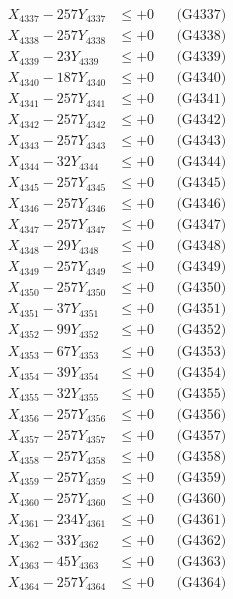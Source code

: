 \documentclass[a4paper,10pt]{article}
\begin{document}
{\begin{align}
X_{4337} - 257Y_{4337} &\leq +0 && \text{(G4337)} \\
X_{4338} - 257Y_{4338} &\leq +0 && \text{(G4338)} \\
X_{4339} - 23Y_{4339} &\leq +0 && \text{(G4339)} \\
X_{4340} - 187Y_{4340} &\leq +0 && \text{(G4340)} \\
\allowbreak
X_{4341} - 257Y_{4341} &\leq +0 && \text{(G4341)} \\
X_{4342} - 257Y_{4342} &\leq +0 && \text{(G4342)} \\
X_{4343} - 257Y_{4343} &\leq +0 && \text{(G4343)} \\
X_{4344} - 32Y_{4344} &\leq +0 && \text{(G4344)} \\
X_{4345} - 257Y_{4345} &\leq +0 && \text{(G4345)} \\
X_{4346} - 257Y_{4346} &\leq +0 && \text{(G4346)} \\
X_{4347} - 257Y_{4347} &\leq +0 && \text{(G4347)} \\
X_{4348} - 29Y_{4348} &\leq +0 && \text{(G4348)} \\
X_{4349} - 257Y_{4349} &\leq +0 && \text{(G4349)} \\
X_{4350} - 257Y_{4350} &\leq +0 && \text{(G4350)} \\
\allowbreak
X_{4351} - 37Y_{4351} &\leq +0 && \text{(G4351)} \\
X_{4352} - 99Y_{4352} &\leq +0 && \text{(G4352)} \\
X_{4353} - 67Y_{4353} &\leq +0 && \text{(G4353)} \\
X_{4354} - 39Y_{4354} &\leq +0 && \text{(G4354)} \\
X_{4355} - 32Y_{4355} &\leq +0 && \text{(G4355)} \\
X_{4356} - 257Y_{4356} &\leq +0 && \text{(G4356)} \\
X_{4357} - 257Y_{4357} &\leq +0 && \text{(G4357)} \\
X_{4358} - 257Y_{4358} &\leq +0 && \text{(G4358)} \\
X_{4359} - 257Y_{4359} &\leq +0 && \text{(G4359)} \\
X_{4360} - 257Y_{4360} &\leq +0 && \text{(G4360)} \\
\allowbreak
X_{4361} - 234Y_{4361} &\leq +0 && \text{(G4361)} \\
X_{4362} - 33Y_{4362} &\leq +0 && \text{(G4362)} \\
X_{4363} - 45Y_{4363} &\leq +0 && \text{(G4363)} \\
X_{4364} - 257Y_{4364} &\leq +0 && \text{(G4364)} \\

\end{align}}
\end{document}
